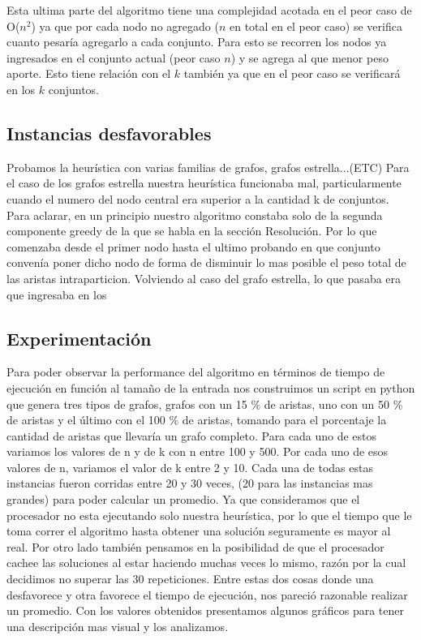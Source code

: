 Esta ultima parte del algoritmo tiene una complejidad acotada en el peor caso de O($n^{2}$) ya que por cada nodo no agregado ($n$ en total en el peor caso) se verifica cuanto pesaría agregarlo a cada conjunto. Para esto se recorren los nodos ya ingresados en el conjunto actual (peor caso $n$) y se agrega al que menor peso aporte. Esto tiene relación con el $k$ también ya que en el peor caso se verificará en los $k$ conjuntos.

\subsection{Instancias desfavorables}


Probamos la heurística con varias familias de grafos, grafos estrella...(ETC) 
Para el caso de los grafos estrella nuestra heurística funcionaba mal, particularmente cuando el numero del nodo central era superior a la cantidad k de conjuntos. 
Para aclarar, en un principio nuestro algoritmo constaba solo de la segunda componente greedy de la que se habla en la sección Resolución. Por lo que comenzaba desde el primer nodo hasta el ultimo probando en que conjunto convenía poner dicho nodo de forma de disminuir lo mas posible el peso total de las aristas intraparticion. Volviendo al caso del grafo estrella, lo que pasaba era que ingresaba en los

\subsection{Experimentación}

Para poder observar la performance del algoritmo en términos de tiempo de ejecución en función al tamaño de la entrada nos construimos un script en python que genera tres tipos de grafos, grafos con un 15 \% de aristas, uno con un 50 \% de aristas y el último con el 100 \% de aristas, tomando para el porcentaje la cantidad de aristas que llevaría un grafo completo.
Para cada uno de estos variamos los valores de n y de k con n entre 100 y 500. 
Por cada uno de esos valores de n, variamos el valor de k entre 2 y 10.
Cada una de todas estas instancias fueron corridas entre 20 y 30 veces, (20 para las instancias mas grandes) para poder calcular un promedio. Ya que consideramos que el procesador no esta ejecutando solo nuestra heurística, por lo que el tiempo que le toma correr el algoritmo hasta obtener una solución seguramente es mayor al real. Por otro lado también pensamos en la posibilidad de que el procesador cachee las soluciones al estar haciendo muchas veces lo mismo, razón por la cual decidimos no superar las 30 repeticiones. Entre estas dos cosas donde una desfavorece y otra favorece el tiempo de ejecución, nos pareció razonable realizar un promedio.
Con los valores obtenidos presentamos algunos gráficos para tener una descripción mas visual y los analizamos.

